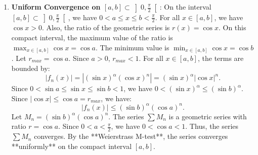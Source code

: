 \documentclass[12pt]{article}
\begin{document}
\begin{correctionbox}
\begin{enumerate}
    ---

    \item \textbf{Uniform Convergence on $[a, b] \subset \left]0, \frac{\pi}{2}\right[$}:
    On the interval $[a, b] \subset \left]0, \frac{\pi}{2}\right[$, we have $0 < a \leq x \leq b < \frac{\pi}{2}$.
    For all $x \in [a, b]$, we have $\cos x > 0$.
    Also, the ratio of the geometric series is $r(x) = \cos x$.
    On this compact interval, the maximum value of the ratio is $\max_{x \in [a, b]} \cos x = \cos a$.
    The minimum value is $\min_{x \in [a, b]} \cos x = \cos b$.
    Let $r_{max} = \cos a$. Since $a > 0$, $r_{max} < 1$.
    For all $x \in [a, b]$, the terms are bounded by:
    $$ |f_n(x)| = |(\sin x)^\alpha (\cos x)^n| = (\sin x)^\alpha |\cos x|^n. $$
    Since $0 < \sin a \leq \sin x \leq \sin b < 1$, we have $0 < (\sin x)^\alpha \leq (\sin b)^\alpha$.
    Since $|\cos x| \leq \cos a = r_{max}$, we have:
    $$ |f_n(x)| \leq (\sin b)^\alpha (\cos a)^n. $$
    Let $M_n = (\sin b)^\alpha (\cos a)^n$. The series $\sum M_n$ is a geometric series with ratio $r = \cos a$.
    Since $0 < a < \frac{\pi}{2}$, we have $0 < \cos a < 1$.
    Thus, the series $\sum M_n$ converges.
    By the **Weierstrass M-test**, the series converges **uniformly** on the compact interval $[a, b]$.
\end{enumerate}
\end{correctionbox}
\end{document}
